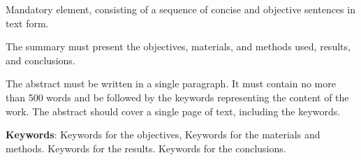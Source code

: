 
\noindent%
Mandatory element, consisting of a sequence of concise and objective sentences in text form.

\noindent 
The summary must present the objectives, materials, and methods used, results, and conclusions. 

\noindent 
The abstract must be written in a single paragraph. It must contain no more than 500 words and be followed by the keywords representing the content of the work. The abstract should cover a single page of text, including the keywords.
\vfill

\noindent \textbf {Keywords}: Keywords  for the objectives, Keywords  for the materials and methods. Keywords for the results. Keywords for the conclusions.